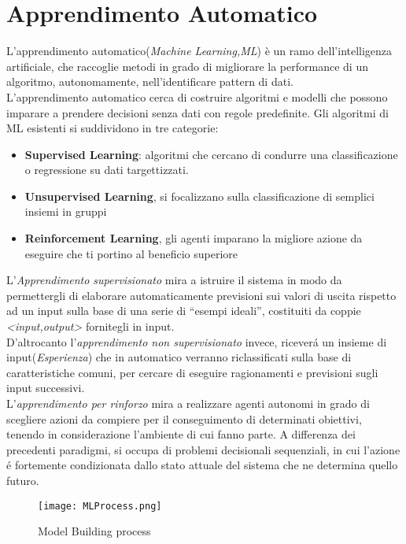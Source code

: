 \documentclass[../tesi.tex]{subfiles}
\begin{document}
\section{Apprendimento Automatico}
L’apprendimento automatico(\textit{Machine Learning,ML}) è un ramo dell’intelligenza artificiale, che raccoglie metodi in grado di migliorare la performance di un algoritmo, autonomamente, nell’identificare pattern di dati.\cite{enwiki:1046345973}\\
L’apprendimento automatico cerca di costruire algoritmi e modelli che possono imparare a prendere decisioni senza dati con regole predefinite. Gli algoritmi di ML esistenti si suddividono in tre categorie:
\begin{itemize}
  \item \textbf{Supervised Learning}: algoritmi che cercano di condurre una classificazione o regressione su dati targettizzati.
  \item \textbf{Unsupervised Learning}, si focalizzano sulla classificazione di semplici insiemi in gruppi 
  \item \textbf{Reinforcement Learning}, gli agenti imparano la migliore azione da eseguire che ti portino al beneficio superiore
\end{itemize}
L'\textit{Apprendimento supervisionato} mira a istruire il sistema in modo da permettergli di elaborare automaticamente previsioni sui valori di uscita rispetto ad un input sulla base di una serie di ``esempi ideali'', costituiti da coppie \textit{\textless input,output\textgreater} \space fornitegli in input.\cite{enwiki:1033187514}\\
D'altrocanto l'\textit{apprendimento non supervisionato} invece, riceverá un insieme di input(\textit{Esperienza}) che in automatico verranno riclassificati sulla base di caratteristiche comuni, per cercare di eseguire ragionamenti e previsioni sugli input successivi.\cite{enwiki:1043586308}\\
L'\textit{apprendimento per rinforzo} mira a realizzare agenti autonomi in grado di scegliere azioni da compiere per il conseguimento di determinati obiettivi, tenendo in considerazione l'ambiente di cui fanno parte.
A differenza dei precedenti paradigmi, si occupa di problemi decisionali sequenziali, in cui l'azione é fortemente condizionata dallo stato attuale del sistema che ne determina quello futuro.\cite{enwiki:1046562875}

\begin{figure}[htbp]
  \centering
  \texttt{[image: MLProcess.png]}
  \caption{Model Building process} 
  \end{figure}
\end{document}
